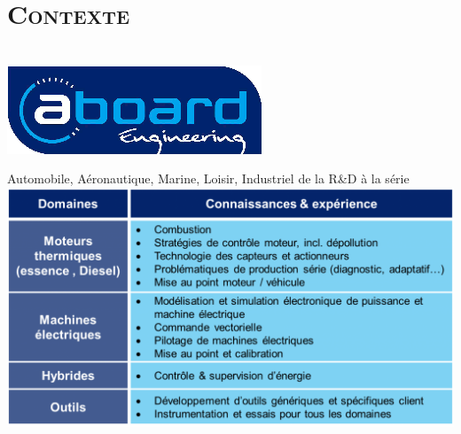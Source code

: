\documentclass[xcolor=x11names,compress]{beamer}
\begin{document}
\section{\scshape Contexte}
\begin{frame}{\vspace{-17pt}\\\includegraphics[scale=0.20]{images/aboard}}
  \begin{center}
	{\footnotesize Automobile, Aéronautique, Marine, Loisir, Industriel de la
	R\&D à la série}\\
	\vspace{10pt}
	\includegraphics[scale=0.3]{images/domaines}\\
  \end{center}
\end{frame}

\end{document}
